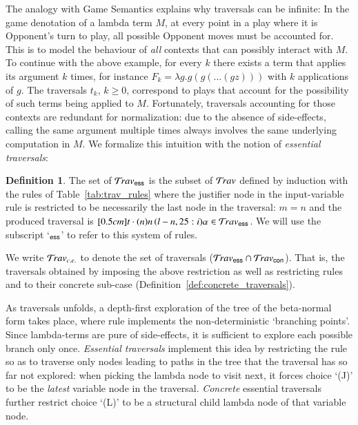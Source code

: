\documentclass{elsarticle}
\theoremstyle{plain}
\theoremstyle{definition}
\newtheorem{definition}{Definition}[section]
\newcommand\Nodes{\mathcal{N}}%
\newcommand\NodesVar{\Nodes_{\sf var}}%
\newcommand{\essential}{{\sf ess}}
\newcommand{\concrete}{{\sf con}}
\newcommand{\travsetes}{{\travset_\essential}} %
\newcommand{\travsetcon}{{\travset_\concrete}} %
\newcommand{\travsetcones}{\travset_{c.e.}} %
\newcommand{\travulc}{\travset}
\newcommand{\rulefont}[1]{\mathbf{\sf #1}}
\newcommand{\enables}{\vdash} %
\newcommand{\ExternalNodes}{\Nodes^{\sf ext}}
\begin{document}
The analogy with Game Semantics explains why traversals can be infinite: In the game denotation of a lambda term $M$, at every point in a play where it is Opponent's turn to play, all possible Opponent moves must be accounted for.
This is to model the behaviour of \emph{all} contexts that can possibly interact with $M$. To continue with the above example, for every $k$ there exists a term that applies its argument $k$ times, for instance $F_k = \lambda g . g (g ( \ldots (g z)))$ with $k$ applications of $g$.
The traversals $t_k$, $k\geq 0$, correspond to plays
 that account for the possibility of
 such terms being applied to $M$. Fortunately, traversals accounting for those contexts are redundant for normalization: due to the absence of side-effects, calling the same argument multiple times always involves the same underlying computation in $M$. We formalize this intuition with the notion of \emph{essential traversals}:

\begin{definition}
\label{dfn:essential_traversals}
The set of  $\travsetes$ is the subset of $\travulc$ defined by induction with the rules of Table~\ref{tab:trav_rules} where the justifier node in the
input-variable rule  is restricted to be necessarily the last node in the traversal: $m=n$ and the produced traversal is $\Pstr[0.5cm]{t \cdot (n){n} \, (l-n,25:i){\alpha}} \in \travsetes$.
We will use the subscript `${}_\essential$' to refer to this system of rules.

We write $\travsetcones$ to denote the set of
 traversals ($\travsetes \inter \travsetcon$).
 That is, the traversals obtained by imposing the above restriction as well as restricting rules  and  to their concrete sub-case (Definition~\ref{def:concrete_traversals}).
\end{definition}

As traversals unfolds, a depth-first exploration of the tree of the beta-normal form takes place, where rule  implements the non-deterministic `branching points'. Since lambda-terms are pure of side-effects,
it is sufficient to explore each possible branch only once.
\emph{Essential traversals} implement this idea by restricting the rule  so as to traverse only nodes leading to paths in the tree that the traversal has so far not explored: when picking the lambda node to visit next, it forces choice `(J)' to be the \emph{latest} variable node in the traversal. \emph{Concrete} essential traversals further restrict choice `(L)' to be a structural child lambda node of that variable node.
\end{document}
